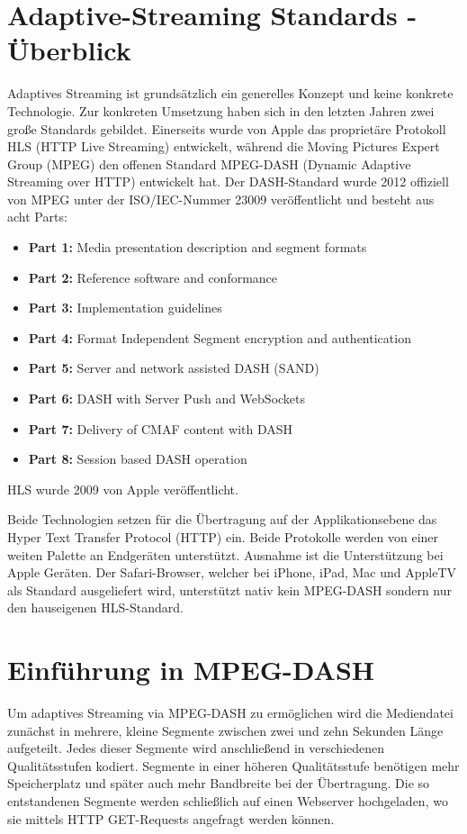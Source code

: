 \documentclass[paper = a4, fontsize = 12pt, parskip = half]{scrartcl} %
\begin{document}
\section{Adaptive-Streaming Standards - Überblick}
Adaptives Streaming ist grundsätzlich ein generelles Konzept und keine konkrete Technologie. Zur konkreten Umsetzung haben sich in den letzten Jahren zwei große Standards gebildet. Einerseits wurde von Apple das proprietäre Protokoll HLS (HTTP Live Streaming) entwickelt, während die Moving Pictures Expert Group (MPEG) den offenen Standard MPEG-DASH (Dynamic Adaptive Streaming over HTTP) entwickelt hat. Der DASH-Standard wurde 2012 offiziell von MPEG unter der ISO/IEC-Nummer 23009 veröffentlicht und besteht aus acht Parts:

\begin{itemize}
    \item \textbf{Part 1:} Media presentation description and segment formats
    \item \textbf{Part 2:} Reference software and conformance
    \item \textbf{Part 3:} Implementation guidelines
    \item \textbf{Part 4:} Format Independent Segment encryption and authentication
    \item \textbf{Part 5:} Server and network assisted DASH (SAND)
    \item \textbf{Part 6:} DASH with Server Push and WebSockets
    \item \textbf{Part 7:} Delivery of CMAF content with DASH
    \item \textbf{Part 8:} Session based DASH operation
\end{itemize}

HLS wurde 2009 von Apple veröffentlicht.

Beide Technologien setzen für die Übertragung auf der Applikationsebene das Hyper Text Transfer Protocol (HTTP) ein. Beide Protokolle werden von einer weiten Palette an Endgeräten unterstützt. Ausnahme ist die Unterstützung bei Apple Geräten. Der Safari-Browser, welcher bei iPhone, iPad, Mac und AppleTV als Standard ausgeliefert wird, unterstützt nativ kein MPEG-DASH sondern nur den hauseigenen HLS-Standard.

\section{Einführung in MPEG-DASH}
Um adaptives Streaming via MPEG-DASH zu ermöglichen wird die Mediendatei zunächst in mehrere, kleine Segmente zwischen zwei und zehn Sekunden Länge aufgeteilt. Jedes dieser Segmente wird anschließend in verschiedenen Qualitätsstufen kodiert. Segmente in einer höheren Qualitätsstufe benötigen mehr Speicherplatz und später auch mehr Bandbreite bei der Übertragung. Die so entstandenen Segmente werden schließlich auf einen Webserver hochgeladen, wo sie mittels HTTP GET-Requests angefragt werden können. 
\end{document}
